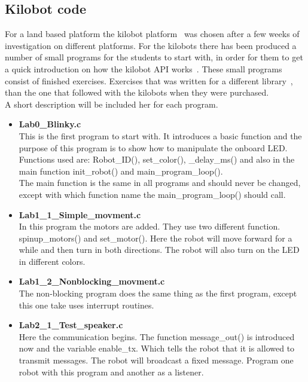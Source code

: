 \subsection{Kilobot code}
For a land based platform the kilobot platform~\cite{kilobotsK-Team} was chosen after a few weeks of investigation on different platforms. For the kilobots there has been produced a number of small programs for the students to start with, in order for them to get a quick introduction on how the kilobot API works~\cite{kilobotsK-Team}. These small programs consist of finished exercises. Exercises that was written for a different library~\cite{kilobotsLabs}, than the one that followed with the kilobots when they were purchased.\\
A short description will be included her for each program.
\begin{itemize}
\item \textbf{Lab0\_Blinky.c}\\
This is the first program to start with. It introduces a basic function and the purpose of this program is to show how to manipulate the onboard LED.
Functions used are: Robot\_ID(), set\_color(), \_delay\_ms() and also in the main function init\_robot() and main\_program\_loop().\\
The main function is the same in all programs and should never be changed, except with which function name the main\_program\_loop() should call.

\item \textbf{Lab1\_1\_Simple\_movment.c}\\
In this program the motors are added. They use two different function.\\
spinup\_motors() and set\_motor(). Here the robot will move forward for a while and then turn in both directions. The robot will also turn on the LED in different colors.

\item \textbf{Lab1\_2\_Nonblocking\_movment.c}\\
The non-blocking program does the same thing as the first program, except this one take uses interrupt routines.

\item \textbf{Lab2\_1\_Test\_speaker.c}\\
Here the communication begins. The function message\_out() is introduced now and the variable enable\_tx. Which tells the robot that it is allowed to transmit messages. The robot will broadcast a fixed message.
Program one robot with this program and another as a listener. 


\end{itemize}
